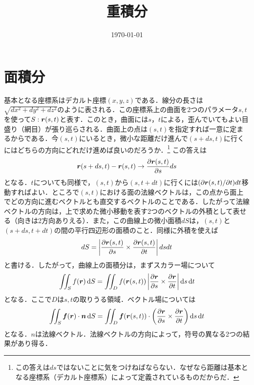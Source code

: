 \documentclass[a4paper,10pt,uplatex]{jsarticle}
\begin{document}
\title{重積分}
\author{}
\date{\today}
\maketitle

\section*{面積分}
基本となる座標系はデカルト座標$(x,y,z)$である．線分の長さは$\sqrt{dx^2+dy^2+dz^2}$のように表される．この座標系上の曲面を2つのパラメータ$s,t$を使って$S:\vb*{r}(s,t)$と表す．このとき，曲面には$s$，$t$による，歪んでいてもよい目盛り（網目）が張り巡らされる．曲面上の点は$(s,t)$を指定すれば一意に定まるからである．今$(s,t)$にいるとき，微小な距離だけ進んで$(s+ds,t)$に行くにはどちらの方向にどれだけ進めば良いのだろうか．\footnote{この答えは$ds$ではないことに気をつけねばならない．なぜなら距離は基本となる座標系（デカルト座標系）によって定義されているものだからだ．}
この答えは
\begin{equation}
    \vb*{r}(s+ds,t) - \vb*{r}(s,t) \to \pdv{\vb*{r}(s,t)}{s} ds
\end{equation}
となる．$t$についても同様で，$(s,t)$から$(s,t+dt)$に行くには$(\partial\vb*{r}(s,t)/\partial t)dt$移動すればよい．ところで$(s,t)$における面の法線ベクトルは，この点から面上でどの方向に進むベクトルとも直交するベクトルのことである．したがって法線ベクトルの方向は，上で求めた微小移動を表す2つのベクトルの外積として表せる（向きは2方向ありえる）．また，この曲線上の微小面積$dS$は，$(s,t)$と$(s+ds,t+dt)$の間の平行四辺形の面積のこと．同様に外積を使えば
\begin{equation}
    dS = \left|\pdv{\vb*{r}(s,t)}{s} \times \pdv{\vb*{r}(s,t)}{t}\right|dsdt
\end{equation}
と書ける．したがって，曲線上の面積分は，まずスカラー場について
\begin{equation}
    \iint_S f(\vb*{r}) \dd{S} = \iint_D f(\vb*{r}(s,t)) \left|\pdv{\vb*{r}}{s} \times \pdv{\vb*{r}}{t}\right|\dd{s}\dd{t}
\end{equation}
となる．ここで$D$は$s,t$の取りうる領域．ベクトル場については
\begin{equation}
    \iint_S \vb*{f}(\vb*{r}) \cdot \vb*{n} \dd{S} = \iint_D \vb*{f}(\vb*{r}(s,t)) \cdot \left( \pdv{\vb*{r}}{s} \times \pdv{\vb*{r}}{t}\right) \dd{s}\dd{t}
\end{equation}
となる．$n$は法線ベクトル．法線ベクトルの方向によって，符号の異なる2つの結果があり得る．
\end{document}
